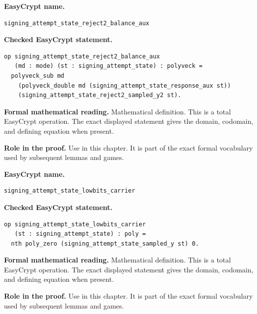 \begin{formaldefinition}
\noindent\textbf{EasyCrypt name.}
\begin{lstlisting}[language=EasyCrypt,basicstyle=\ttfamily\scriptsize]
signing_attempt_state_reject2_balance_aux
\end{lstlisting}
\noindent\textbf{Checked EasyCrypt statement.}
\begin{lstlisting}[language=EasyCrypt,basicstyle=\ttfamily\scriptsize]
op signing_attempt_state_reject2_balance_aux
   (md : mode) (st : signing_attempt_state) : polyveck =
  polyveck_sub md
    (polyveck_double md (signing_attempt_state_response_aux st))
    (signing_attempt_state_reject2_sampled_y2 st).
\end{lstlisting}
\noindent\textbf{Formal mathematical reading.}
Mathematical definition. This is a total EasyCrypt operation.  The exact displayed statement gives the domain, codomain, and defining equation when present.

\noindent\textbf{Role in the proof.}
Use in this chapter. It is part of the exact formal vocabulary used by subsequent lemmas and games.

\end{formaldefinition}

\begin{formaldefinition}
\noindent\textbf{EasyCrypt name.}
\begin{lstlisting}[language=EasyCrypt,basicstyle=\ttfamily\scriptsize]
signing_attempt_state_lowbits_carrier
\end{lstlisting}
\noindent\textbf{Checked EasyCrypt statement.}
\begin{lstlisting}[language=EasyCrypt,basicstyle=\ttfamily\scriptsize]
op signing_attempt_state_lowbits_carrier
   (st : signing_attempt_state) : poly =
  nth poly_zero (signing_attempt_state_sampled_y st) 0.
\end{lstlisting}
\noindent\textbf{Formal mathematical reading.}
Mathematical definition. This is a total EasyCrypt operation.  The exact displayed statement gives the domain, codomain, and defining equation when present.

\noindent\textbf{Role in the proof.}
Use in this chapter. It is part of the exact formal vocabulary used by subsequent lemmas and games.

\end{formaldefinition}

